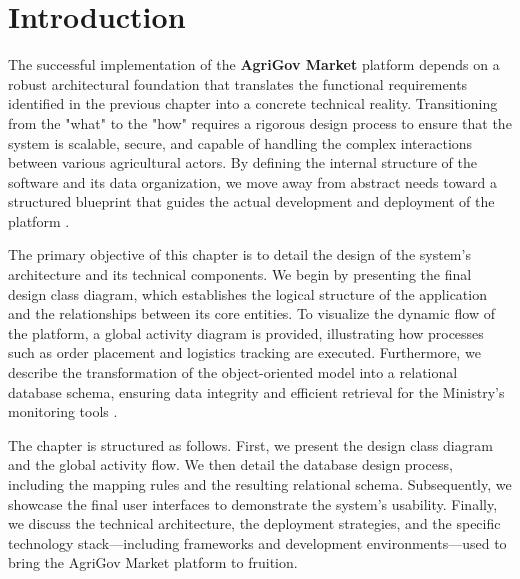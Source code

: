 \section{Introduction}

The successful implementation of the \textbf{AgriGov Market} platform depends on a robust architectural foundation that translates the functional requirements identified in the previous chapter into a concrete technical reality. Transitioning from the "what" to the "how" requires a rigorous design process to ensure that the system is scalable, secure, and capable of handling the complex interactions between various agricultural actors. By defining the internal structure of the software and its data organization, we move away from abstract needs toward a structured blueprint that guides the actual development and deployment of the platform \cite{Pressman2024}.

The primary objective of this chapter is to detail the design of the system's architecture and its technical components. We begin by presenting the final design class diagram, which establishes the logical structure of the application and the relationships between its core entities. To visualize the dynamic flow of the platform, a global activity diagram is provided, illustrating how processes such as order placement and logistics tracking are executed. Furthermore, we describe the transformation of the object-oriented model into a relational database schema, ensuring data integrity and efficient retrieval for the Ministry's monitoring tools \cite{Bass2021}.

The chapter is structured as follows. First, we present the design class diagram and the global activity flow. We then detail the database design process, including the mapping rules and the resulting relational schema. Subsequently, we showcase the final user interfaces to demonstrate the system's usability. Finally, we discuss the technical architecture, the deployment strategies, and the specific technology stack—including frameworks and development environments—used to bring the AgriGov Market platform to fruition.